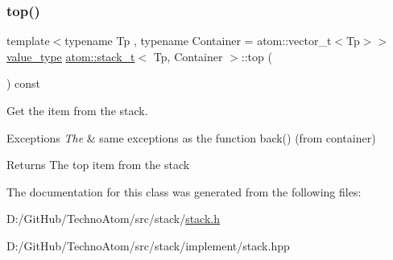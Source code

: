 \subsubsection{\texorpdfstring{top()}{top()}}
{\footnotesize\ttfamily template$<$typename Tp , typename Container  = atom\+::vector\+\_\+t$<$\+Tp$>$$>$ \\
\hyperlink{classatom_1_1stack__t_a37733753643a75fca01979480f888d8e}{value\+\_\+type} \hyperlink{classatom_1_1stack__t}{atom\+::stack\+\_\+t}$<$ Tp, Container $>$\+::top (\begin{DoxyParamCaption}{ }\end{DoxyParamCaption}) const\hspace{0.3cm}{\ttfamily [inline]}}



Get the item from the stack. 


\begin{DoxyExceptions}{Exceptions}
{\em The} & same exceptions as the function back() (from container) \\
\hline
\end{DoxyExceptions}
\begin{DoxyReturn}{Returns}
The top item from the stack 
\end{DoxyReturn}


The documentation for this class was generated from the following files\+:\begin{DoxyCompactItemize}
\item 
D\+:/\+Git\+Hub/\+Techno\+Atom/src/stack/\hyperlink{stack_8h}{stack.\+h}\item 
D\+:/\+Git\+Hub/\+Techno\+Atom/src/stack/implement/stack.\+hpp\end{DoxyCompactItemize}
